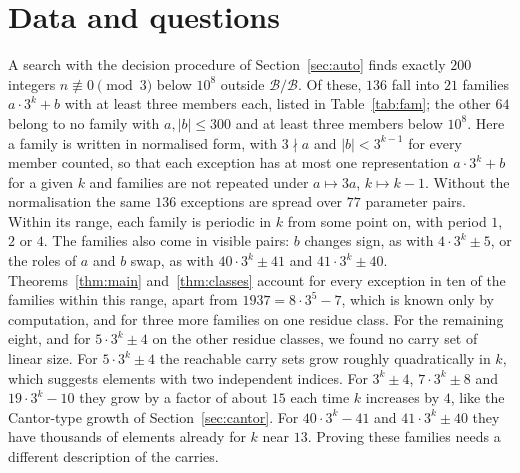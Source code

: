 \documentclass[11pt]{amsart}
\theoremstyle{definition}
\newcommand{\B}{\mathcal{B}}
\begin{document}
\section{Data and questions}\label{sec:data}

A search with the decision procedure of Section~\ref{sec:auto} finds exactly $200$ integers
$n\not\equiv 0\pmod 3$ below $10^8$ outside $\B/\B$. Of these, $136$ fall into $21$ families
$a\cdot 3^k+b$ with at least three members each, listed in Table~\ref{tab:fam}; the other $64$ belong to no
family with $a,|b|\le 300$ and at least three members below $10^8$. Here a family is written in normalised form, with
$3\nmid a$ and $|b|<3^{k-1}$ for every member counted, so that each exception has at most one
representation $a\cdot 3^k+b$ for a given $k$ and families are not repeated under $a\mapsto 3a$, $k\mapsto k-1$. Without
the normalisation the same $136$ exceptions are spread over $77$ parameter pairs. Within its range, each family is
periodic in $k$ from some point on, with period $1$, $2$ or $4$. The families also come in visible pairs:
$b$ changes sign, as with $4\cdot 3^k\pm 5$, or the roles of $a$ and $b$ swap, as with $40\cdot 3^k\pm 41$
and $41\cdot 3^k\pm 40$. Theorems~\ref{thm:main} and~\ref{thm:classes} account for every exception in ten of the
families within this range, apart from $1937=8\cdot 3^5-7$, which is known only by computation, and
for three more families on one residue class. For the remaining eight, and for
$5\cdot 3^k\pm 4$ on the other residue classes, we found no carry set of linear size. For
$5\cdot 3^k\pm 4$ the reachable carry sets grow roughly quadratically in $k$, which suggests elements with
two independent indices. For $3^k\pm 4$, $7\cdot 3^k\pm 8$ and $19\cdot 3^k-10$ they grow by a factor of
about $15$ each time $k$ increases by $4$, like the Cantor-type growth of Section~\ref{sec:cantor}. For
$40\cdot 3^k-41$ and $41\cdot 3^k\pm 40$ they have thousands of elements already for $k$ near $13$.
Proving these families needs a different description of the carries.
\end{document}
